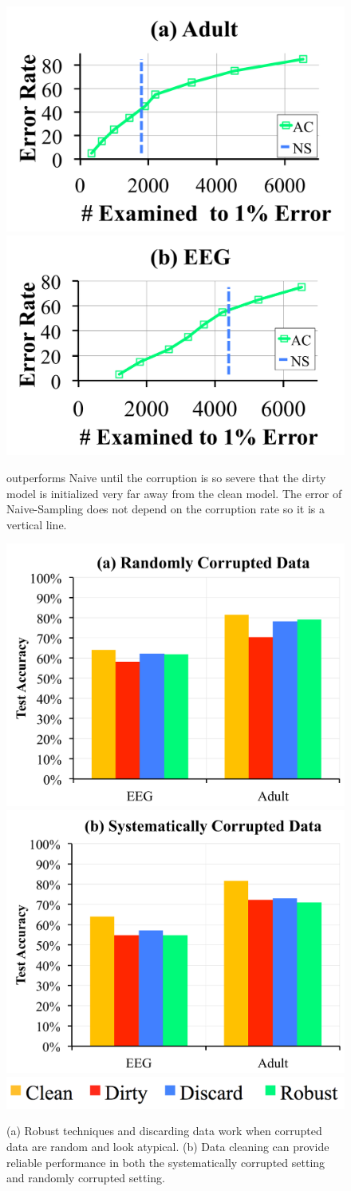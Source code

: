 \begin{figure}[t]
\centering
 \includegraphics[width=0.49\columnwidth]{exp/exp9a.pdf}
  \includegraphics[width=0.49\columnwidth]{exp/exp9b.pdf}\vspace{-1em}
 \caption{\sys outperforms Naive until the corruption is so severe that the dirty model is initialized very far away from the clean model.
  The error of Naive-Sampling does not depend on the corruption rate so it is a vertical line.  \label{bias}}
\end{figure}

\begin{figure}[t]
\centering
 \includegraphics[width=0.49\columnwidth]{exp/exp2.pdf}
 \includegraphics[width=0.49\columnwidth]{exp/exp1.pdf}
 \includegraphics[width=0.5\columnwidth]{exp/legend-1.png}
 \caption{(a) Robust techniques and discarding data work when corrupted data are random and look atypical. (b) Data cleaning can provide reliable performance in both the systematically corrupted setting and randomly corrupted setting.\label{sys-rand}}
\end{figure}

